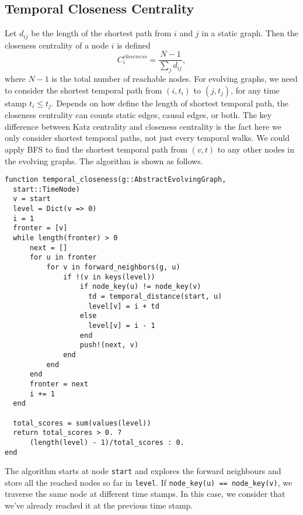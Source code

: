 \documentclass[12pt]{article}
\theoremstyle{definition}
\begin{document}
\subsection{Temporal Closeness Centrality}
\label{sec:temp-betw-centr}


Let $d_{ij}$ be the length of the shortest path from $i$ and $j$ in a static graph. Then
the closeness centrality of a node $i$ is defined
$$
C_i^{closeness} = \frac{N-1}{\sum_j d_{ij}},
$$
where $N-1$ is the total number of reachable nodes.
For evolving graphs, we need to consider the shortest temporal path from $(i,t_i)$ to $(j,t_j)$, for any time stamp $t_i \leq t_j$.
Depends on how define the length of shortest temporal path, the closeness centrality can counts static edges, causal edges, or both.
The key difference between Katz centrality and closeness centrality is the fact here we only consider shortest temporal paths, not just every temporal walks.
We could apply BFS to find the shortest temporal path from $(v,t)$ to any other nodes in the evolving graphs. The algorithm is shown as follows.

\begin{lstlisting}
function temporal_closeness(g::AbstractEvolvingGraph,
  start::TimeNode)
  v = start
  level = Dict(v => 0)
  i = 1
  fronter = [v]
  while length(fronter) > 0
      next = []
      for u in fronter
          for v in forward_neighbors(g, u)
              if !(v in keys(level))
                  if node_key(u) != node_key(v)
                    td = temporal_distance(start, u)
                    level[v] = i + td
                  else
                    level[v] = i - 1
                  end
                  push!(next, v)
              end
          end
      end
      fronter = next
      i += 1
  end

  total_scores = sum(values(level))
  return total_scores > 0. ?
      (length(level) - 1)/total_scores : 0.
end
\end{lstlisting}
The algorithm starts at node \texttt{start} and explores the forward neighbours and store all the
reached nodes so far in \texttt{level}. If \texttt{node\_key(u) == node\_key(v)}, we traverse the same node at different time stamps. In this case, we consider that we've already reached it at the previous time stamp.
\end{document}
